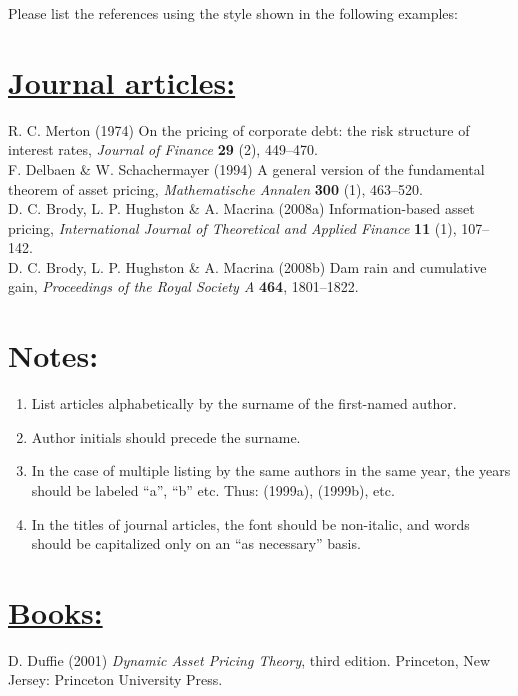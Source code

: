 \documentclass{ws-ijtaf}
\begin{document}
Please list the references using the style shown in the following examples:

\def\newsection#1{\section*{\underline{#1}}}

\newsection{Journal articles:}

\noindent R. C. Merton (1974) On the pricing of corporate debt: the risk structure of interest rates,
{\it Journal of Finance} {\bf 29} (2), 449--470.\\[3pt]

\noindent F. Delbaen \& W. Schachermayer (1994) A general version of the fundamental theorem
of asset pricing, {\it Mathematische Annalen} {\bf 300} (1), 463--520.\\[3pt]

\noindent D. C. Brody, L. P. Hughston \& A. Macrina (2008a) Information-based asset pricing,
{\it International Journal of Theoretical and Applied Finance} {\bf 11} (1), 107--142.\\[3pt]

\noindent D. C. Brody, L. P. Hughston \& A. Macrina (2008b) Dam rain and cumulative gain,
{\it Proceedings of the Royal Society A} {\bf 464}, 1801--1822.

\section*{Notes:}
\begin{enumerate}[4.]
\item[1.] List articles alphabetically by the surname of the first-named author.

\item[2.] Author initials should precede the surname.

\item[3.] In the case of multiple listing by the same authors in the same year, the years should be labeled ``a'', ``b'' etc. Thus: (1999a), (1999b), etc.

\item[4.] In the titles of journal articles, the font should be non-italic, and words should be capitalized only on an ``as necessary'' basis.
\end{enumerate}

\newsection{Books:}
\noindent D. Duffie (2001) {\it Dynamic Asset Pricing Theory}, third edition.
Princeton, New Jersey: Princeton University Press.\\[3pt]
\end{document}
